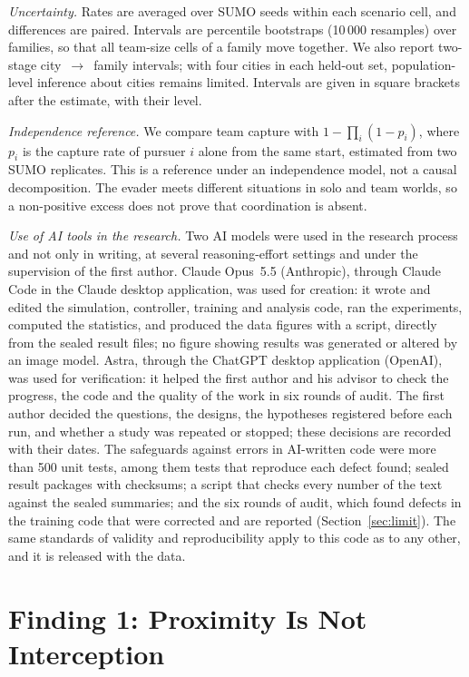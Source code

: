 \documentclass[5p,twocolumn]{elsarticle}
\begin{document}
\emph{Uncertainty.} Rates are averaged over SUMO seeds within each scenario cell, and differences are paired.
Intervals are percentile bootstraps (10\,000 resamples) over families, so that all team-size cells of a family move
together. We also report two-stage city~$\to$~family intervals; with four cities in each held-out set,
population-level inference about cities remains limited. Intervals are given in square brackets after the estimate,
with their level.

\emph{Independence reference.} We compare team capture with $1-\prod_i(1-p_i)$, where $p_i$ is the capture rate of
pursuer $i$ alone from the same start, estimated from two SUMO replicates. This is a reference under an independence
model, not a causal decomposition. The evader meets different situations in solo and team worlds, so a non-positive
excess does not prove that coordination is absent.

\emph{Use of AI tools in the research.} Two AI models were used in the research process and not only in writing,
at several reasoning-effort settings and under the supervision of the first author. Claude Opus~5.5 (Anthropic),
through Claude Code in the Claude desktop application, was used for creation: it wrote and edited the simulation,
controller, training and analysis code, ran the experiments, computed the statistics, and produced the data figures
with a script, directly from the sealed result files; no figure showing results was generated or altered by an image
model. Astra, through the ChatGPT desktop application (OpenAI), was used for verification: it helped the first author
and his advisor to check the progress, the code and the quality of the work in six rounds of audit. The first author
decided the questions, the designs, the hypotheses registered before each run, and whether a study was repeated or
stopped; these decisions are recorded with their dates. The safeguards against errors in AI-written code were more
than 500 unit tests, among them tests that reproduce each defect found; sealed result packages with checksums; a
script that checks every number of the text against the sealed summaries; and the six rounds of audit, which found
defects in the training code that were corrected and are reported (Section~\ref{sec:limit}). The same standards of
validity and reproducibility apply to this code as to any other, and it is released with the data.

\section{Finding 1: Proximity Is Not Interception}
\label{sec:measurement}
\end{document}
